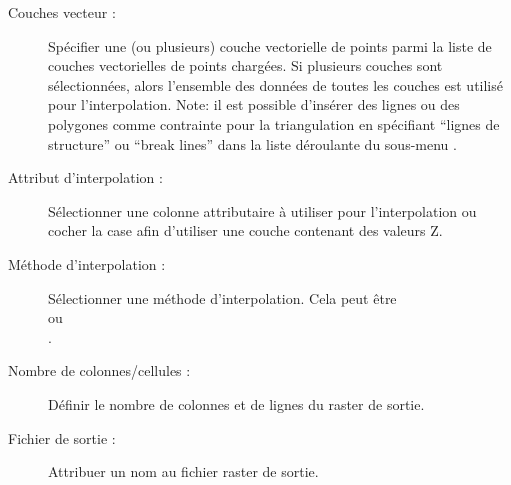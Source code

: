 \begin{description}
\item[Couches vecteur :] Sp\'ecifier une (ou plusieurs) couche 
vectorielle de points parmi la liste de couches vectorielles de points 
charg\'ees. Si plusieurs couches sont s\'electionn\'ees, alors l'ensemble des 
donn\'ees de toutes les couches est utilis\'e pour l'interpolation. 
Note: il est possible d'ins\'erer des lignes ou des polygones comme contrainte 
pour la triangulation en sp\'ecifiant ``lignes de structure'' ou ``break lines'' 
dans la liste d\'eroulante du sous-menu .
\item[Attribut d'interpolation :] S\'electionner une colonne 
attributaire \`a utiliser pour l'interpolation ou cocher la case 
 afin d'utiliser une
couche contenant des valeurs Z.
\item[M\'ethode d'interpolation :] S\'electionner une m\'ethode 
d'interpolation. Cela peut \^etre\\  
ou\\ .
\item[Nombre de colonnes/cellules :] D\'efinir le nombre de colonnes et 
de lignes du raster de sortie.
\item[Fichier de sortie :] Attribuer un nom au fichier raster de 
sortie.
\end{description}

